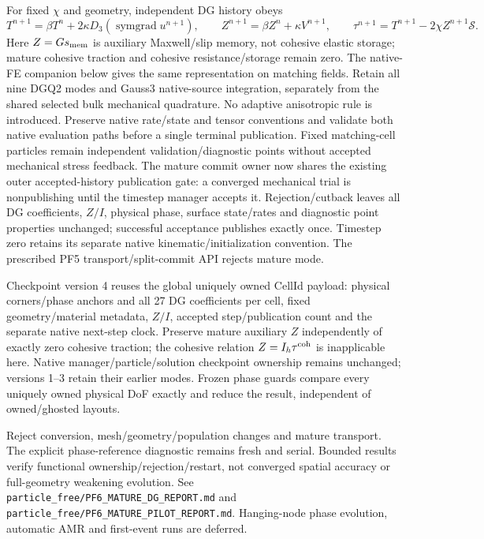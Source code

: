\documentclass[11pt]{article}
\begin{document}
For fixed $\chi$ and geometry, independent DG history obeys
\[
 T^{n+1}=\beta T^n+2\kappa D_3(\operatorname{symgrad}u^{n+1}),\qquad
 Z^{n+1}=\beta Z^n+\kappa V^{n+1},\qquad
 \tau^{n+1}=T^{n+1}-2\chi Z^{n+1}\mathcal S.
\]
Here $Z=G s_{\rm mem}$ is auxiliary Maxwell/slip memory, not cohesive elastic
storage; mature cohesive traction and cohesive resistance/storage remain zero.
The native-FE companion below gives the same representation on matching fields.
Retain all nine DGQ2 modes and Gauss3 native-source integration, separately from
the shared selected bulk mechanical quadrature. No adaptive anisotropic rule
is introduced. Preserve native rate/state and tensor conventions and validate
both native evaluation paths before a single terminal publication. Fixed
matching-cell particles remain independent validation/diagnostic points without
accepted mechanical stress feedback. The mature commit owner now shares the
existing outer accepted-history publication gate: a converged mechanical trial
is nonpublishing until the timestep manager accepts it. Rejection/cutback leaves
all DG coefficients, $Z/I$, physical phase, surface state/rates and diagnostic
point properties unchanged; successful acceptance publishes exactly once.
Timestep zero retains its separate native kinematic/initialization convention.
The prescribed PF5 transport/split-commit API rejects mature mode.

Checkpoint version 4 reuses the global uniquely owned CellId payload: physical
corners/phase anchors and all 27 DG coefficients per cell, fixed geometry/material
metadata, $Z/I$, accepted step/publication count and the separate native next-step
clock. Preserve mature auxiliary $Z$ independently of exactly zero cohesive
traction; the cohesive relation $Z=I_h\tau^{\rm coh}$ is inapplicable here.
Native manager/particle/solution checkpoint ownership remains unchanged; versions
1--3 retain their earlier modes. Frozen phase guards compare every uniquely owned
physical DoF exactly and reduce the result, independent of owned/ghosted layouts.

Reject conversion, mesh/geometry/population changes and mature transport. The
explicit phase-reference diagnostic remains fresh and serial. Bounded results
verify functional ownership/rejection/restart, not converged spatial accuracy or
full-geometry weakening evolution. See
\texttt{particle\_free/PF6\_MATURE\_DG\_REPORT.md} and
\texttt{particle\_free/PF6\_MATURE\_PILOT\_REPORT.md}.
Hanging-node phase evolution, automatic AMR and first-event runs are deferred.
\end{document}
